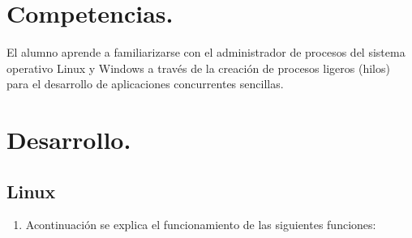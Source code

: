 \documentclass[12pt]{article}
\begin{document}
\section{Competencias.}
El alumno aprende a familiarizarse con el administrador de procesos del sistema operativo Linux y Windows a través de la creación de  procesos ligeros (hilos) para el desarrollo de aplicaciones concurrentes sencillas.
\section{Desarrollo.}
    \subsection{Linux}
    \begin{enumerate}
    
    \item Acontinuación se explica el funcionamiento de las siguientes funciones: 
    

\end{enumerate}
\end{document}
